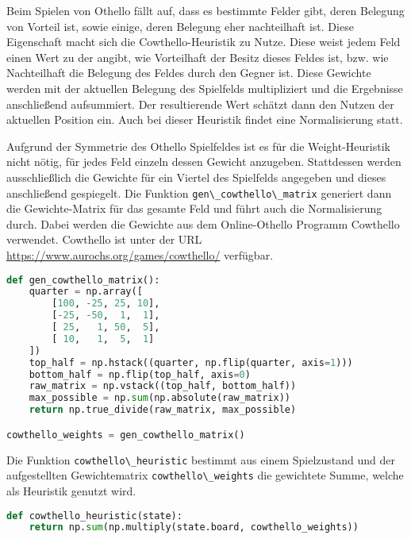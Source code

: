 Beim Spielen von Othello fällt auf, dass es bestimmte Felder gibt, deren
Belegung von Vorteil ist, sowie einige, deren Belegung eher nachteilhaft
ist. Diese Eigenschaft macht sich die Cowthello-Heuristik zu Nutze.
Diese weist jedem Feld einen Wert zu der angibt, wie Vorteilhaft der
Besitz dieses Feldes ist, bzw. wie Nachteilhaft die Belegung des Feldes
durch den Gegner ist. Diese Gewichte werden mit der aktuellen Belegung
des Spielfelds multipliziert und die Ergebnisse anschließend
aufsummiert. Der resultierende Wert schätzt dann den Nutzen der
aktuellen Position ein. Auch bei dieser Heuristik findet eine
Normalisierung statt.

Aufgrund der Symmetrie des Othello Spielfeldes ist es für die
Weight-Heuristik nicht nötig, für jedes Feld einzeln dessen Gewicht
anzugeben. Stattdessen werden ausschließlich die Gewichte für ein
Viertel des Spielfelds angegeben und dieses anschließend gespiegelt. Die
Funktion \passthrough{\lstinline!gen\_cowthello\_matrix!} generiert dann
die Gewichte-Matrix für das gesamte Feld und führt auch die
Normalisierung durch. Dabei werden die Gewichte aus dem Online-Othello
Programm Cowthello verwendet. Cowthello ist unter der URL
\url{https://www.aurochs.org/games/cowthello/} verfügbar.

\begin{lstlisting}[language=Python]
def gen_cowthello_matrix():
    quarter = np.array([
        [100, -25, 25, 10],
        [-25, -50,  1,  1],
        [ 25,   1, 50,  5],
        [ 10,   1,  5,  1]
    ])
    top_half = np.hstack((quarter, np.flip(quarter, axis=1)))
    bottom_half = np.flip(top_half, axis=0)
    raw_matrix = np.vstack((top_half, bottom_half))
    max_possible = np.sum(np.absolute(raw_matrix))
    return np.true_divide(raw_matrix, max_possible)

cowthello_weights = gen_cowthello_matrix()
\end{lstlisting}

Die Funktion \passthrough{\lstinline!cowthello\_heuristic!} bestimmt aus
einem Spielzustand und der aufgestellten Gewichtematrix
\passthrough{\lstinline!cowthello\_weights!} die gewichtete Summe,
welche als Heuristik genutzt wird.

\begin{lstlisting}[language=Python]
def cowthello_heuristic(state):
    return np.sum(np.multiply(state.board, cowthello_weights))
\end{lstlisting}

